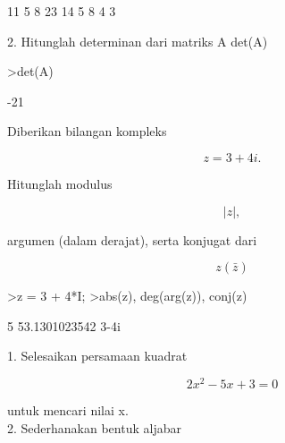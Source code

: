 \documentclass[a4paper,10pt]{article}
\begin{document}
\begin{eulernotebook}
\begin{eulercomment}
\begin{eulercomment}
\begin{eulercomment}
\begin{eulercomment}
\begin{euleroutput}
             11             5             8 
             23            14             5 
              8             4             3 
\end{euleroutput}
\begin{eulercomment}
2. Hitunglah determinan dari matriks A det(A)
\end{eulercomment}
\begin{eulerprompt}
>det(A)
\end{eulerprompt}
\begin{euleroutput}
  -21
\end{euleroutput}
\begin{eulercomment}
Diberikan bilangan kompleks\\
\end{eulercomment}
\begin{eulerformula}
\[
 z = 3 + 4i. 
\]
\end{eulerformula}
\begin{eulercomment}
Hitunglah modulus \\
\end{eulercomment}
\begin{eulerformula}
\[
\vert{}z\vert{}, 
\]
\end{eulerformula}
\begin{eulercomment}
argumen (dalam derajat), serta konjugat dari\\
\end{eulercomment}
\begin{eulerformula}
\[
z (\bar{z})
\]
\end{eulerformula}
\begin{eulerprompt}
>z = 3 + 4*I;
>abs(z), deg(arg(z)), conj(z)
\end{eulerprompt}
\begin{euleroutput}
  5
  53.1301023542
  3-4i
\end{euleroutput}
\begin{eulercomment}
1. Selesaikan persamaan kuadrat \\
\end{eulercomment}
\begin{eulerformula}
\[
2x^2 - 5x + 3 = 0
\]
\end{eulerformula}
\begin{eulercomment}
untuk mencari nilai x.   \\
2. Sederhanakan bentuk aljabar \\
\end{eulercomment}
\begin{eulerformula}

\end{eulerformula}
\end{eulercomment}
\end{eulercomment}
\end{eulercomment}
\end{eulercomment}
\end{eulernotebook}
\end{document}
